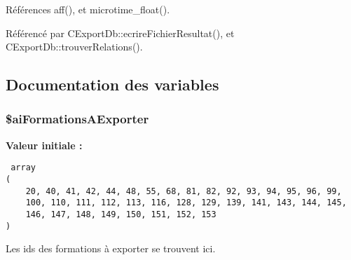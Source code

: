 Références aff(), et microtime\_\-float().

Référencé par CExportDb::ecrireFichierResultat(), et CExportDb::trouverRelations().

\subsection{Documentation des variables}
\subsubsection{\setlength{\rightskip}{0pt plus 5cm}\$aiFormationsAExporter}\label{export_8php_330347cd4f9a9f14ad95e62e17c04bbf}


\textbf{Valeur initiale :}

\begin{Code}\begin{verbatim} array
(
    20, 40, 41, 42, 44, 48, 55, 68, 81, 82, 92, 93, 94, 95, 96, 99, 
    100, 110, 111, 112, 113, 116, 128, 129, 139, 141, 143, 144, 145, 
    146, 147, 148, 149, 150, 151, 152, 153
)
\end{verbatim}
\end{Code}
Les ids des formations à exporter se trouvent ici. 

